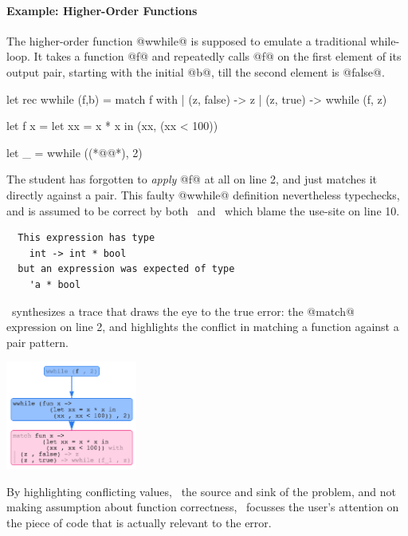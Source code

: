 \paragraph{Example: Higher-Order Functions}
%
The higher-order function @wwhile@ is supposed
to emulate a traditional while-loop. It takes
a function @f@ and repeatedly calls @f@ on the
first element of its output pair, starting with
the initial @b@, till the second element is @false@.
%
\begin{ecode}
  let rec wwhile (f,b) =
    match f with
    | (z, false) -> z
    | (z, true)  -> wwhile (f, z)

  let f x =
    let xx = x * x in
    (xx, (xx < 100))

  let _ = wwhile ((*@@*), 2)
\end{ecode}
%
The student has forgotten to \emph{apply} @f@ at all on line 2,
and just matches it directly against a pair.
This faulty @wwhile@ definition nevertheless typechecks,
and is assumed to be correct by both \ocaml\ and \sherrloc\
which blame the use-site on line 10.
%
\begin{verbatim}
  This expression has type
    int -> int * bool
  but an expression was expected of type
    'a * bool
\end{verbatim}
%
\toolname\ synthesizes a trace that draws the eye to the
true error: the @match@ expression on line 2, and highlights
the conflict in matching a function against a pair pattern.
%
\begin{center}
  \includegraphics[height=135px]{wwhile.png}
\end{center}
%
By highlighting conflicting values, \ie\ the source and sink
of the problem, and not making assumption about function correctness, \toolname\
focusses the user's attention on the piece of code that is
actually relevant to the error.

